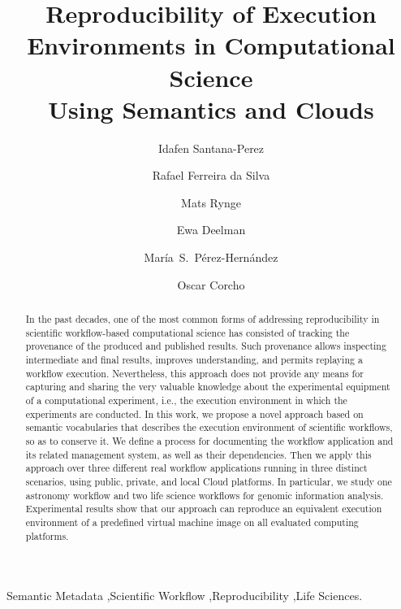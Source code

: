 \documentclass[final,5p,times,twocolumn]{elsarticle}
\begin{document}
\begin{frontmatter}

\title{Reproducibility of Execution Environments in Computational Science\\Using Semantics and Clouds}

\author[upm]{Idafen Santana-Perez}

\author[isi]{Rafael Ferreira da Silva}

\author[isi]{Mats Rynge}

\author[isi]{Ewa Deelman}

\author[upm]{Mar\'ia~S.~P\'erez-Hern\'andez}

\author[upm]{Oscar Corcho}


\address[upm]{Ontology Engineering Group, Universidad Polit\'ecnica de Madrid, Madrid, Spain }
\address[isi]{University of Southern California, Information Sciences Institute, Marina del Rey, CA, USA}


\begin{abstract}
In the past decades, one of the most common forms of addressing reproducibility in 
scientific workflow-based computational science has consisted of
tracking the provenance of the produced and published results. Such provenance allows 
inspecting intermediate and final results, improves understanding, and permits 
replaying a workflow execution. Nevertheless, this approach does not provide any 
means for capturing and sharing the very valuable knowledge about the experimental 
equipment of a computational experiment, i.e., the execution environment in which 
the experiments are conducted. In this work, we propose a novel approach based
on semantic vocabularies that describes the execution environment of scientific workflows, 
so as to conserve it. We define a process for documenting the workflow 
application and its related management system, as well as their dependencies. 
Then we apply this approach over three different real workflow applications running in  three 
distinct  scenarios, using public, private, and local Cloud platforms. In particular, we study 
one astronomy workflow and two life science workflows for genomic information analysis.
Experimental results show that our approach can reproduce an equivalent execution environment of 
a predefined virtual machine image on all evaluated computing platforms.
\end{abstract}

\begin{keyword}
Semantic Metadata \sep Scientific Workflow \sep Reproducibility \sep Life Sciences.
\end{keyword}


\end{frontmatter}
\end{document}
